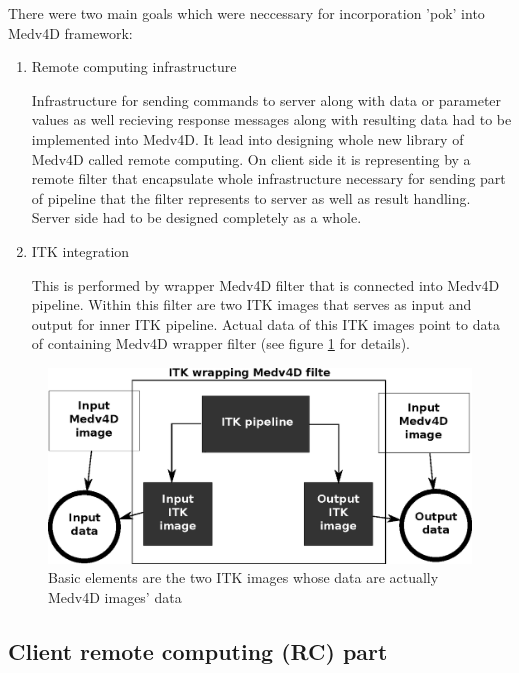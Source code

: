 \par
There were two main goals which were neccessary for incorporation 'pok' into
Medv4D framework:
\begin{enumerate}

  \item{Remote computing infrastructure}
  \par
  Infrastructure for sending commands to server along with data or parameter values as well recieving response messages along with resulting data had to be implemented into Medv4D.
It lead into designing whole new library of Medv4D called remote computing.
On client side it is representing by a remote filter that encapsulate whole infrastructure necessary for sending part of pipeline that the filter represents to server as well as result handling.
Server side had to be designed completely as a whole.

  \item{ITK integration}
  \par
  This is performed by wrapper Medv4D filter that is connected into Medv4D pipeline.
Within this filter are two ITK images that serves as input and output for inner ITK pipeline.
Actual data of this ITK images point to data of containing Medv4D wrapper filter (see figure \ref{fg:ITKWrapping} for details).

\end{enumerate}

\begin{figure}
    \centering
    \includegraphics[width=12cm]{data/ITKFilter}
    \caption[ITK wrapper Medv4D filter]{Basic elements are the two ITK images whose data are actually Medv4D images' data}
    \label{fg:ITKWrapping}
\end{figure}

\subsection{Client remote computing (RC) part}

